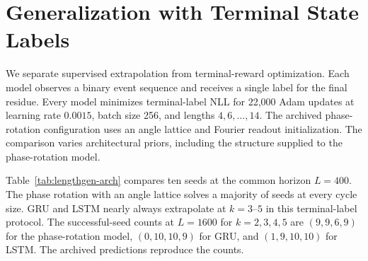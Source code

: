 \section{Generalization with Terminal State Labels}
\label{sec:lengthgen-arch}

We separate supervised extrapolation from terminal-reward optimization. Each
model observes a binary event sequence and receives a single label for the final
residue. Every model minimizes terminal-label NLL for 22,000 Adam updates at
learning rate $0.0015$, batch size 256, and lengths $4,6,\ldots,14$. The archived
phase-rotation configuration uses an angle lattice and Fourier readout initialization.
The comparison varies architectural priors, including the structure supplied
to the phase-rotation model.

Table~\ref{tab:lengthgen-arch} compares ten seeds at the common horizon $L=400$.
The phase rotation with an angle lattice solves a majority of seeds at every
cycle size. GRU and LSTM nearly always extrapolate at $k=3$--$5$ in this
terminal-label protocol. The successful-seed counts at $L=1600$ for
$k=2,3,4,5$ are
$(9,9,6,9)$ for the phase-rotation model, $(0,10,10,9)$ for GRU, and $(1,9,10,10)$ for LSTM.
The archived predictions reproduce the counts.

